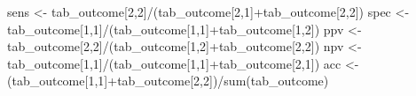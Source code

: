 \documentclass[
  letterpaper,
]{krantz}
\makeatletter
\newenvironment{Shaded}{\begin{snugshade}}{\end{snugshade}}
\newcommand{\CommentTok}[1]{\textcolor[rgb]{0.37,0.37,0.37}{#1}}
\newcommand{\DecValTok}[1]{\textcolor[rgb]{0.68,0.00,0.00}{#1}}
\newcommand{\FloatTok}[1]{\textcolor[rgb]{0.68,0.00,0.00}{#1}}
\newcommand{\FunctionTok}[1]{\textcolor[rgb]{0.28,0.35,0.67}{#1}}
\newcommand{\NormalTok}[1]{\textcolor[rgb]{0.00,0.23,0.31}{#1}}
\newcommand{\OtherTok}[1]{\textcolor[rgb]{0.00,0.23,0.31}{#1}}
\newcommand{\SpecialCharTok}[1]{\textcolor[rgb]{0.37,0.37,0.37}{#1}}
\newenvironment{kframe}{%
\medskip{}
\setlength{\fboxsep}{.8em}
 \def\at@end@of@kframe{}%
 \ifinner\ifhmode%
  \def\at@end@of@kframe{\end{minipage}}%
  \begin{minipage}{\columnwidth}%
 \fi\fi%
 \def\FrameCommand##1{\hskip\@totalleftmargin \hskip-\fboxsep
 \colorbox{shadecolor}{##1}\hskip-\fboxsep
     \hskip-\linewidth \hskip-\@totalleftmargin \hskip\columnwidth}%
 \MakeFramed {\advance\hsize-\width
   \@totalleftmargin\z@ \linewidth\hsize
   \@setminipage}}%
 {\par\unskip\endMakeFramed%
 \at@end@of@kframe}
\renewenvironment{Shaded}{\begin{kframe}}{\end{kframe}}
\makeatother
\begin{document}
\begin{Shaded}
\end{Shaded}

\begin{Shaded}
\begin{Highlighting}[]
\NormalTok{sens }\OtherTok{\textless{}{-}}\NormalTok{ tab\_outcome[}\DecValTok{2}\NormalTok{,}\DecValTok{2}\NormalTok{]}\SpecialCharTok{/}\NormalTok{(tab\_outcome[}\DecValTok{2}\NormalTok{,}\DecValTok{1}\NormalTok{]}\SpecialCharTok{+}\NormalTok{tab\_outcome[}\DecValTok{2}\NormalTok{,}\DecValTok{2}\NormalTok{])}
\NormalTok{spec }\OtherTok{\textless{}{-}}\NormalTok{ tab\_outcome[}\DecValTok{1}\NormalTok{,}\DecValTok{1}\NormalTok{]}\SpecialCharTok{/}\NormalTok{(tab\_outcome[}\DecValTok{1}\NormalTok{,}\DecValTok{1}\NormalTok{]}\SpecialCharTok{+}\NormalTok{tab\_outcome[}\DecValTok{1}\NormalTok{,}\DecValTok{2}\NormalTok{])}
\NormalTok{ppv }\OtherTok{\textless{}{-}}\NormalTok{ tab\_outcome[}\DecValTok{2}\NormalTok{,}\DecValTok{2}\NormalTok{]}\SpecialCharTok{/}\NormalTok{(tab\_outcome[}\DecValTok{1}\NormalTok{,}\DecValTok{2}\NormalTok{]}\SpecialCharTok{+}\NormalTok{tab\_outcome[}\DecValTok{2}\NormalTok{,}\DecValTok{2}\NormalTok{])}
\NormalTok{npv }\OtherTok{\textless{}{-}}\NormalTok{ tab\_outcome[}\DecValTok{1}\NormalTok{,}\DecValTok{1}\NormalTok{]}\SpecialCharTok{/}\NormalTok{(tab\_outcome[}\DecValTok{1}\NormalTok{,}\DecValTok{1}\NormalTok{]}\SpecialCharTok{+}\NormalTok{tab\_outcome[}\DecValTok{2}\NormalTok{,}\DecValTok{1}\NormalTok{])}
\NormalTok{acc }\OtherTok{\textless{}{-}}\NormalTok{ (tab\_outcome[}\DecValTok{1}\NormalTok{,}\DecValTok{1}\NormalTok{]}\SpecialCharTok{+}\NormalTok{tab\_outcome[}\DecValTok{2}\NormalTok{,}\DecValTok{2}\NormalTok{])}\SpecialCharTok{/}\FunctionTok{sum}\NormalTok{(tab\_outcome)}
\end{Highlighting}
\end{Shaded}
\end{document}
